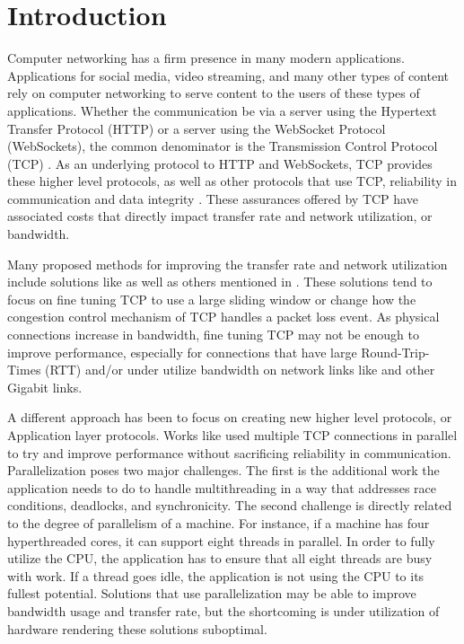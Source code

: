 \chapter{Introduction}

Computer networking has a firm presence in many modern applications. Applications for social media, video streaming, and many other types of content rely on computer networking to serve content to the users of these types of applications. Whether the communication be via a server using the Hypertext Transfer Protocol (HTTP) or a server using the WebSocket Protocol (WebSockets), the common denominator is the Transmission Control Protocol (TCP) \cite{fielding1999hypertext}\cite{fette2011websocket}. As an underlying protocol to HTTP and WebSockets, TCP provides these higher level protocols, as well as other protocols that use TCP, reliability in communication and data integrity \cite{cerf1978specification}. These assurances offered by TCP have associated costs that directly impact transfer rate and network utilization, or bandwidth.

Many proposed methods for improving the transfer rate and network utilization include solutions like \cite{brakmo1995tcp}\cite{wei2006fast}\cite{xu2004binary}\cite{ha2008cubic} as well as others mentioned in \cite{ha2008cubic}\cite{He2002}. These solutions tend to focus on fine tuning TCP to use a large sliding window or change how the congestion control mechanism of TCP handles a packet loss event. As physical connections increase in bandwidth, fine tuning TCP may not be enough to improve performance, especially for connections that have large Round-Trip-Times (RTT) and/or under utilize bandwidth \cite{Fan2010} on network links like \cite{Pfister2001} and other Gigabit links.

A different approach has been to focus on creating new higher level protocols, or Application layer protocols. Works like \cite{Allman1995}\cite{Allman1997}\cite{Sivakumar2000psockets} used multiple TCP connections in parallel to try and improve performance without sacrificing reliability in communication. Parallelization poses two major challenges. The first is the additional work the application needs to do to handle multithreading in a way that addresses race conditions, deadlocks, and synchronicity. The second challenge is directly related to the degree of parallelism of a machine. For instance, if a machine has four hyperthreaded cores, it can support eight threads in parallel. In order to fully utilize the CPU, the application has to ensure that all eight threads are busy with work. If a thread goes idle, the application is not using the CPU to its fullest potential. Solutions that use parallelization may be able to improve bandwidth usage and transfer rate, but the shortcoming is under utilization of hardware rendering these solutions suboptimal.

